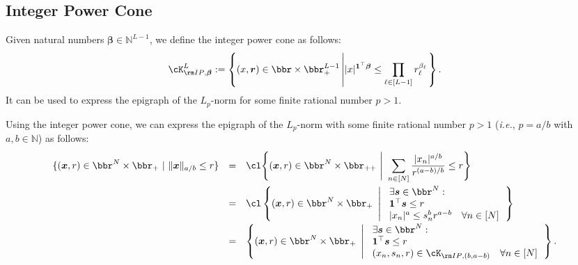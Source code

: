 \documentclass[opre, blindrev]{informs4}
\newcommand{\1}[1]{\mathds{1}{\left(#1\right)}}
\begin{document}
\begin{appendices}
\section{Integer Power Cone}
\label{sec:IntegerPowerCone}

Given natural numbers $\bm \beta \in \mathbb{N}^{L-1}$, we define the integer power cone as follows:
$$
\cK^L_{{\rm IP},\bm \beta} := \displaystyle \left\{ (x,\bm r) \in \bbr \times \bbr_+^{L-1}  \left| |x|^{\bm 1^\top \bm \beta} \leq \prod_{\ell \in [L-1]} r^{\beta_\ell}_\ell \right.\right\}.
$$
It can be used to express the epigraph of the $L_p$-norm for some finite rational number $p>1$.  

\begin{example}
Using the integer power cone, we can express the epigraph of the $L_p$-norm with some finite rational number $p>1$ (\textit{i.e.}, $p=a/b$ with $a,b \in \mathbb{N}$) as follows:
$$
\begin{array}{rcl}
\{(\bm x,r) \in \bbr^{N} \times \bbr_+ ~|~ \|\bm x\|_{a/b} \leq r \}
&=& \displaystyle \cl \Bigg\{ (\bm x,r) \in \bbr^{N} \times \bbr_{++} ~\Bigg|~ \sum_{n \in [N]} \frac{|x_n|^{a/b}}{r^{(a-b)/b}} \leq r \Bigg.\Bigg\} \\[5mm]
&=& \displaystyle \cl\left\{ (\bm x,r) \in \bbr^{N} \times \bbr_{+} ~\left|~
\begin{array}{ll}
\exists \bm s \in \bbr^N: \\
\bm 1^\top \bm s \leq r \\
|x_n|^a \leq s^b_n r^{a-b}  & \forall n \in [N]
\end{array}
\right.\right\} \\ [5mm]
&=& \displaystyle \left\{ (\bm x,r) \in \bbr^{N} \times \bbr_{+} ~\left|~
\begin{array}{ll}
\exists \bm s \in \bbr^N: \\
\bm 1^\top \bm s \leq r \\
(x_n,s_n,r) \in  \cK_{{\rm IP},(b,a-b)}  & \forall n \in [N]
\end{array}
\right.\right\}.
\end{array}
$$
\end{example}


\end{appendices}
\end{document}

